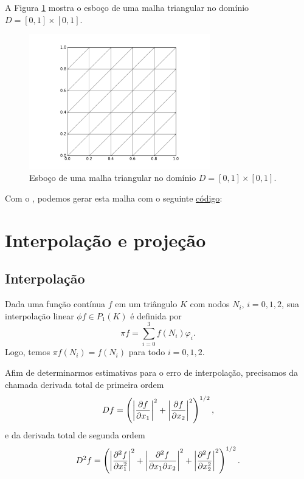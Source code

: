 \begin{ex}\label{ex:malha}
  A Figura \ref{fig:ex_malha} mostra o esboço de uma malha triangular no domínio $D = [0, 1]\times [0, 1]$.

  \begin{figure}[h!]
    \centering
    \includegraphics[width=0.7\textwidth]{./cap_mef2d/dados/ex_malha/fig_ex_malha}
    \caption{Esboço de uma malha triangular no domínio $D = [0, 1]\times [0, 1]$.}
    \label{fig:ex_malha}
  \end{figure}

\ifispython
Com o \fenics, podemos gerar esta malha com o seguinte \href{https://github.com/phkonzen/notas/blob/master/src/MetodoElementosFinitos/cap_mef2d/dados/ex_malha/ex_malha.py}{código}:

\fi
\end{ex}

\section{Interpolação e projeção}\label{cap_mef2d_sec_interp}

\subsection{Interpolação}

Dada uma função contínua $f$ em um triângulo $K$ com nodos $N_i$, $i=0, 1, 2$, sua interpolação linear $\phi f \in P_1(K)$ é definida por
\begin{equation}
  \pi f = \sum_{i=0}^3 f(N_i)\varphi_i.
\end{equation}
Logo, temos $\pi f(N_i) = f(N_i)$ para todo $i=0, 1, 2$.

Afim de determinarmos estimativas para o erro de interpolação, precisamos da chamada derivada total de primeira ordem
\begin{equation}
  Df = \left(\left|\frac{\partial f}{\partial x_1}\right|^2 + \left|\frac{\partial f}{\partial x_2}\right|^2\right)^{1/2},
\end{equation}
e da derivada total de segunda ordem
\begin{equation}
  D^2f = \left(\left|\frac{\partial^2 f}{\partial x_1^2}\right|^2 + \left|\frac{\partial^2 f}{\partial x_1\partial x_2}\right|^2 + \left|\frac{\partial^2 f}{\partial x_2^2}\right|^2\right)^{1/2}.
\end{equation}

